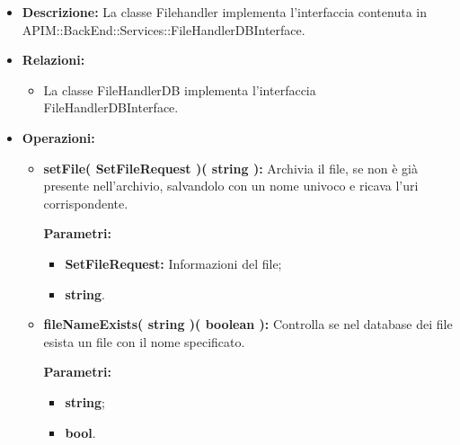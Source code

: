 \begin{itemize}
	\item \textbf{Descrizione:} La classe Filehandler implementa l'interfaccia contenuta in APIM::BackEnd::Services::FileHandlerDBInterface.
	\item \textbf{Relazioni:}
		\begin{itemize}
			\item La classe FileHandlerDB implementa l'interfaccia FileHandlerDBInterface.
		\end{itemize}
	\item \textbf{Operazioni:}
		\begin{itemize}
		
			\item \textbf{setFile( SetFileRequest )( string ):} Archivia il file, se non è già presente nell'archivio, salvandolo con un nome univoco e ricava l'uri corrispondente.
				\begin{description}
    				\item[\textbf{Parametri:}]
				\end{description}
				\begin{itemize}
					\item \textbf{SetFileRequest:} Informazioni del file;
					\item \textbf{string}.
				\end{itemize}
				
			\item \textbf{fileNameExists( string )( boolean ):} Controlla se nel database dei file esista un file con il nome specificato.
				\begin{description}
    				\item[\textbf{Parametri:}]
				\end{description}
				\begin{itemize}
					\item \textbf{string};
					\item \textbf{bool}.
				\end{itemize}
				
		\end{itemize}
\end{itemize}